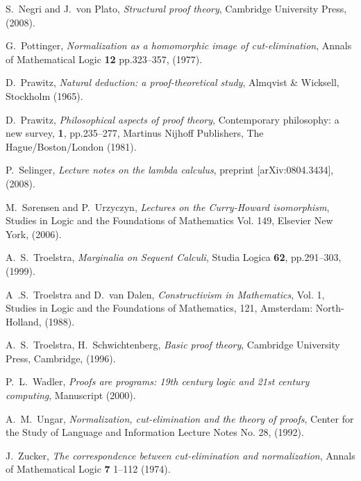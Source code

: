 \documentclass[english,letter paper,12pt,leqno]{article}
\theoremstyle{example}
\numberwithin{equation}{section}
\begin{document}
\begin{thebibliography}{BHLS03}
	S.~Negri and J.~von Plato, \textsl{Structural proof theory}, Cambridge University Press, (2008).
	
	G.~Pottinger, \textsl{Normalization as a homomorphic image of cut-elimination}, Annals of Mathematical Logic \textbf{12} pp.323--357, (1977).
	
	D.~Prawitz, \textsl{Natural deduction: a proof-theoretical study}, Almqvist \& Wicksell, Stockholm (1965).
	
	D.~Prawitz, \textsl{Philosophical aspects of proof theory}, Contemporary philosophy: a new survey, \textbf{1}, pp.235--277, Martinus Nijhoff Publishers, The Hague/Boston/London (1981).
	
	P.~Selinger, \textsl{Lecture notes on the lambda calculus}, preprint \href{https://arxiv.org/abs/0804.3434}[arXiv:0804.3434], (2008).
	
	M.~S\o rensen and P.~Urzyczyn, \textsl{Lectures on the Curry-Howard isomorphism}, Studies in Logic and the Foundations of Mathematics Vol. 149, Elsevier New York, (2006).
	
	A.~S.~Troelstra, \textsl{Marginalia on Sequent Calculi}, Studia Logica \textbf{62}, pp.291--303, (1999).
	
	A~.S.~Troelstra and D.~van Dalen, \textsl{Constructivism in Mathematics}, Vol. 1, Studies in Logic and the Foundations of Mathematics, 121, Amsterdam: North-Holland, (1988).
	
	A.~S.~Troelstra, H.~Schwichtenberg, \textsl{Basic proof theory}, Cambridge University Press, Cambridge, (1996).
	
	P.~L.~Wadler, \textsl{Proofs are programs: 19th century logic and 21st century computing}, Manuscript (2000).
	
	A.~M.~Ungar, \textsl{Normalization, cut-elimination and the theory of proofs}, Center for the Study of Language and Information Lecture Notes No. 28, (1992).
	
	J.~Zucker, \textsl{The correspondence between cut-elimination and normalization}, Annals of Mathematical Logic \textbf{7} 1--112 (1974).
	
	
\end{thebibliography}
\end{document}
